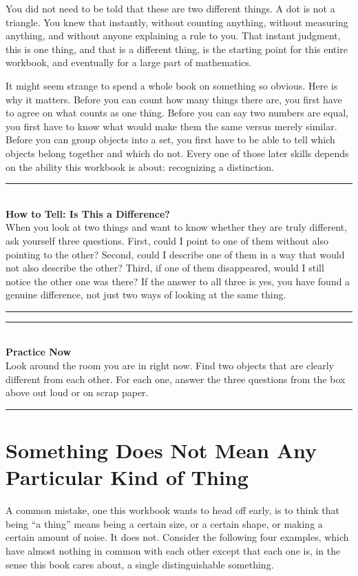 \documentclass[11pt]{book}
\newenvironment{algorithmproc}[1]{%
\vspace{0.6em}\noindent\rule{\linewidth}{0.6pt}\\[0.2em]\textbf{How to Tell: #1}\\[0.3em]}%
{\\[0.2em]\noindent\rule{\linewidth}{0.6pt}\vspace{0.6em}}
\newenvironment{practicenow}{%
\vspace{0.6em}\noindent\rule{\linewidth}{0.6pt}\\[0.2em]\textbf{Practice Now}\\[0.3em]}%
{\\[0.2em]\noindent\rule{\linewidth}{0.6pt}\vspace{0.6em}}
\begin{document}
You did not need to be told that these are two different things. A dot is not a triangle. You knew that instantly, without counting anything, without measuring anything, and without anyone explaining a rule to you. That instant judgment, this is one thing, and that is a different thing, is the starting point for this entire workbook, and eventually for a large part of mathematics.

It might seem strange to spend a whole book on something so obvious. Here is why it matters. Before you can count how many things there are, you first have to agree on what counts as one thing. Before you can say two numbers are equal, you first have to know what would make them the same versus merely similar. Before you can group objects into a set, you first have to be able to tell which objects belong together and which do not. Every one of those later skills depends on the ability this workbook is about: recognizing a distinction.

\begin{algorithmproc}{Is This a Difference?}
When you look at two things and want to know whether they are truly different, ask yourself three questions. First, could I point to one of them without also pointing to the other? Second, could I describe one of them in a way that would not also describe the other? Third, if one of them disappeared, would I still notice the other one was there? If the answer to all three is yes, you have found a genuine difference, not just two ways of looking at the same thing.
\end{algorithmproc}

\begin{practicenow}
Look around the room you are in right now. Find two objects that are clearly different from each other. For each one, answer the three questions from the box above out loud or on scrap paper.
\end{practicenow}

\section{Something Does Not Mean Any Particular Kind of Thing}

A common mistake, one this workbook wants to head off early, is to think that being ``a thing'' means being a certain size, or a certain shape, or making a certain amount of noise. It does not. Consider the following four examples, which have almost nothing in common with each other except that each one is, in the sense this book cares about, a single distinguishable something.
\end{document}
